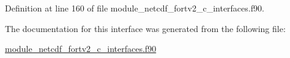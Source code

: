 Definition at line 160 of file module\+\_\+netcdf\+\_\+fortv2\+\_\+c\+\_\+interfaces.\+f90.



The documentation for this interface was generated from the following file\+:\begin{DoxyCompactItemize}
\item 
\hyperlink{module__netcdf__fortv2__c__interfaces_8f90}{module\+\_\+netcdf\+\_\+fortv2\+\_\+c\+\_\+interfaces.\+f90}\end{DoxyCompactItemize}

